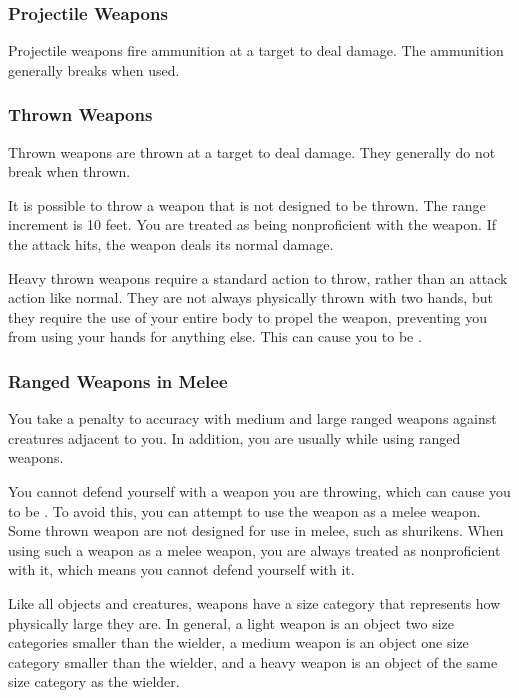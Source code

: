             \subsubsection{Projectile Weapons} Projectile weapons fire ammunition at a target to deal damage. The ammunition generally breaks when used.

            \subsubsection{Thrown Weapons}\label{Thrown Weapons} Thrown weapons are thrown at a target to deal damage. They generally do not break when thrown.

                 It is possible to throw a weapon that is not designed to be thrown. The range increment is 10 feet. You are treated as being nonproficient with the weapon. If the attack hits, the weapon deals its normal damage.

                 Heavy thrown weapons require a standard action to throw, rather than an attack action like normal.
                They are not always physically thrown with two hands, but they require the use of your entire body to propel the weapon, preventing you from using your hands for anything else.
                This can cause you to be .

            \subsubsection{Ranged Weapons in Melee}

                You take a  penalty to accuracy with medium and large ranged weapons against creatures adjacent to you. In addition, you are usually  while using ranged weapons.

                \label{Thrown Weapons in Melee} You cannot defend yourself with a weapon you are throwing, which can cause you to be . To avoid this, you can attempt to use the weapon as a melee weapon. Some thrown weapon are not designed for use in melee, such as shurikens. When using such a weapon as a melee weapon, you are always treated as nonproficient with it, which means you cannot defend yourself with it.

                 Like all objects and creatures, weapons have a size category that represents how physically large they are. In general, a light weapon is an object two size categories smaller than the wielder, a medium weapon is an object one size category smaller than the wielder, and a heavy weapon is an object of the same size category as the wielder.

